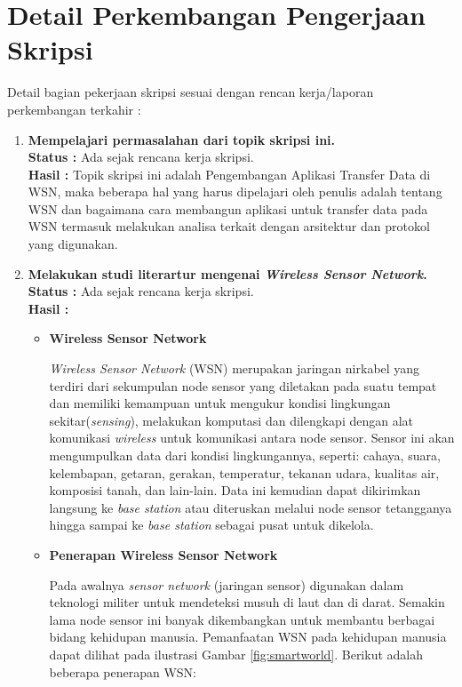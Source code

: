 \documentclass[a4paper,twoside]{article}
\begin{document}
\section{Detail Perkembangan Pengerjaan Skripsi}
Detail bagian pekerjaan skripsi sesuai dengan rencan kerja/laporan perkembangan terkahir :
	\begin{enumerate}
		\item \textbf{Mempelajari permasalahan dari topik skripsi ini.}\\
		{\bf Status :} Ada sejak rencana kerja skripsi.\\
		{\bf Hasil :} Topik skripsi ini adalah Pengembangan Aplikasi Transfer Data di WSN, maka beberapa hal yang harus dipelajari oleh penulis adalah tentang WSN dan bagaimana cara membangun aplikasi untuk transfer data pada WSN termasuk melakukan analisa terkait dengan arsitektur dan protokol yang digunakan.
		
		\item \textbf{Melakukan studi literartur mengenai \textit{Wireless Sensor Network}.}\\
		{\bf Status :} Ada sejak rencana kerja skripsi.\\
		{\bf Hasil :} 
		\begin{itemize}
		\item \textbf{Wireless Sensor Network}
		
		
		\textit{Wireless Sensor Network} (WSN) merupakan jaringan nirkabel yang terdiri dari sekumpulan node sensor yang diletakan pada suatu tempat dan memiliki kemampuan untuk mengukur kondisi lingkungan sekitar(\textit{sensing}), melakukan komputasi dan dilengkapi dengan alat komunikasi \textit{wireless} untuk komunikasi antara node sensor. Sensor ini akan mengumpulkan data dari kondisi lingkungannya, seperti: cahaya, suara, kelembapan, getaran, gerakan, temperatur, tekanan udara, kualitas air, komposisi tanah, dan lain-lain. Data ini kemudian dapat dikirimkan langsung ke \textit{base station} atau diteruskan melalui node sensor tetangganya hingga sampai ke \textit{base station} sebagai pusat untuk dikelola.
\end{itemize}

		\begin{itemize}
		\item \textbf{Penerapan Wireless Sensor Network}

Pada awalnya \textit{sensor network} (jaringan sensor) digunakan dalam teknologi militer untuk mendeteksi musuh di laut dan di darat. Semakin lama node sensor ini banyak dikembangkan untuk membantu berbagai bidang kehidupan manusia. Pemanfaatan WSN pada kehidupan manusia dapat dilihat pada ilustrasi Gambar \ref{fig:smartworld}. Berikut adalah beberapa penerapan WSN:


\end{itemize}
\end{enumerate}
\end{document}
